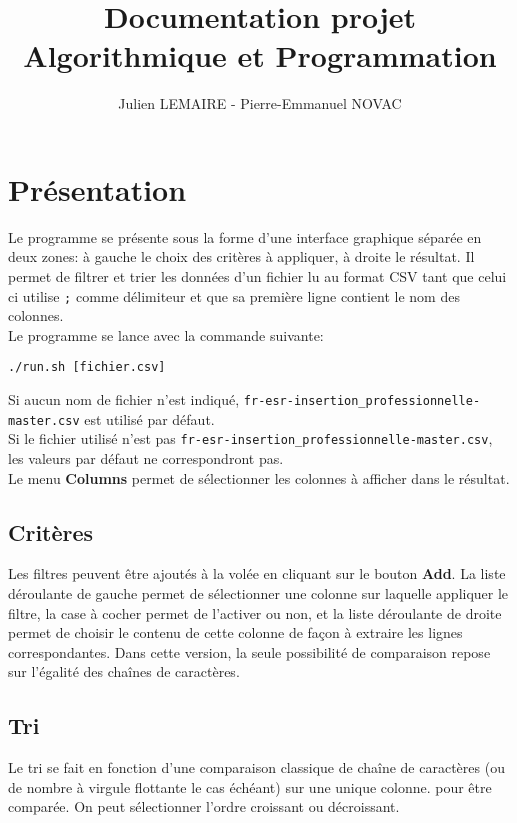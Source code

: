 \documentclass{article}
\title{Documentation projet Algorithmique et Programmation}
\author{Julien LEMAIRE - Pierre-Emmanuel NOVAC}
\begin{document}
\maketitle

\section{Présentation}

Le programme se présente sous la forme d'une interface graphique séparée en deux zones: à gauche le choix des critères à appliquer, à droite le résultat. Il permet de filtrer et trier les données d'un fichier lu au format CSV tant que celui ci utilise \texttt{;} comme délimiteur et que sa première ligne contient le nom des colonnes.\\
Le programme se lance avec la commande suivante:
\begin{lstlisting}
./run.sh [fichier.csv]
\end{lstlisting}
Si aucun nom de fichier n'est indiqué, \texttt{fr-esr-insertion\_professionnelle-master.csv} est utilisé par défaut.\\
Si le fichier utilisé n'est pas \texttt{fr-esr-insertion\_professionnelle-master.csv}, les valeurs par défaut ne correspondront pas.\\
Le menu \textbf{Columns} permet de sélectionner les colonnes à afficher dans le résultat.

\subsection{Critères}

Les filtres peuvent être ajoutés à la volée en cliquant sur le bouton \textbf{Add}. La liste déroulante de gauche permet de sélectionner une colonne sur laquelle appliquer le filtre, la case à cocher permet de l'activer ou non, et la liste déroulante de droite permet de choisir le contenu de cette colonne de façon à extraire les lignes correspondantes. Dans cette version, la seule possibilité de comparaison repose sur l'égalité des chaînes de caractères.\\

\subsection{Tri}

Le tri se fait en fonction d'une comparaison classique de chaîne de caractères (ou de nombre à virgule flottante le cas échéant) sur une unique colonne. pour être comparée. On peut sélectionner l'ordre croissant ou décroissant.
\end{document}
